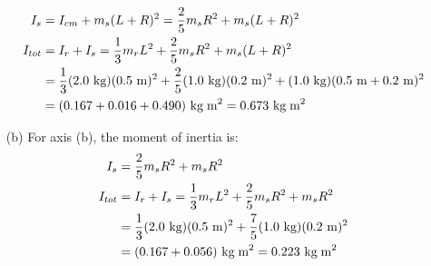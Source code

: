 \documentclass[a4paper]{article}
\newcommand\m{\text{ m}}
\newcommand\kg{\text{ kg}}
\newcommand\kgmm{\text{ kg\;m}^{2}}
\begin{document}
\begin{shaded}
\begin{enumerate}
\begin{align*}
            I_s &= I_{cm} + m_s(L + R)^2 = \frac{2}{5}m_sR^2 + m_s(L + R)^2\\
            I_{tot} &= I_r + I_s = \frac{1}{3}m_rL^2 + \frac{2}{5}m_sR^2 + m_s(L + R)^2\\
            &= \frac{1}{3}(2.0\kg)(0.5\m)^2 + \frac{2}{5}(1.0\kg)(0.2\m)^2 + (1.0\kg)(0.5\m + 0.2\m)^2\\
            &= (0.167 + 0.016 + 0.490)\kgmm = 0.673\kgmm
        \end{align*}
        \item[(b)] For axis (b), the moment of inertia is:
        \begin{align*}
            I_s &= \frac{2}{5}m_sR^2 + m_sR^2\\
            I_{tot} &= I_r + I_s = \frac{1}{3}m_rL^2 + \frac{2}{5}m_sR^2 + m_sR^2\\
            &= \frac{1}{3}(2.0\kg)(0.5\m)^2 + \frac{7}{5}(1.0\kg)(0.2\m)^2\\
            &= (0.167 + 0.056)\kgmm = 0.223\kgmm
        \end{align*}
    \end{enumerate}
\end{shaded}
\end{document}
